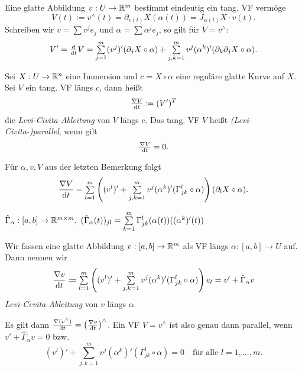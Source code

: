 \documentclass{cheat-sheet}
\begin{document}

\begin{bem}
  Eine glatte Abbildung $v : U \to \mathbb{R}^m$ bestimmt eindeutig ein tang. VF vermöge
  \[ V(t) := v^\wedge(t) = \partial_{v(t)} X(\alpha(t)) = J_{\alpha(t)} X \cdot v(t). \]
  Schreiben wir $v = \sum v^j e_j$ und $\alpha = \sum \alpha^j e_j$, so gilt für $V = v^\wedge$:
  \[ V' = \tfrac{\d}{\d t} V = \sum_{j=1}^m (v^j)' (\partial_j X \circ \alpha) + \sum_{j,k=1}^m v^j (\alpha^k)' (\partial_k \partial_j X \circ \alpha). \]
\end{bem}


\begin{defn}
  Sei $X : U \to \mathbb{R}^n$ eine Immersion und $c = X \circ \alpha$ eine reguläre glatte Kurve auf $X$. Sei $V$ ein tang. VF längs $c$, dann heißt
  \[ \tfrac{\nabla V}{\mathrm{d} t} \coloneqq (V')^T \]
  die \emph{Levi-Civita-Ableitung} von $V$ längs $c$. Das tang. VF $V$ heißt \emph{(Levi-Civita-)parallel}, wenn gilt
  \[ \tfrac{\nabla V}{\mathrm{d} t} = 0. \]
\end{defn}

\begin{bem}
  Für $\alpha, v, V$ aus der letzten Bemerkung folgt
  \[ \frac{\nabla V}{\d t} = \sum_{l=1}^m \left( (v^l)' + \sum_{j,k=1}^m v^j (\alpha^k)' (\Gamma_{jk}^l \circ \alpha) \right) (\partial_l X \circ \alpha). \]
\end{bem}

\begin{nota}
  $\hat{\Gamma}_{\alpha} : [a, b] \to \R^{m \times m}, \,\, (\hat{\Gamma}_{\alpha}(t))_{jl} = \sum_{k=1}^m \Gamma_{jk}^l (\alpha(t))((\alpha^k)'(t))$
\end{nota}

\begin{defn}
  Wir fassen eine glatte Abbildung $v : [a, b] \to \mathbb{R}^m$ als VF längs $\alpha : [a, b] \to U$ auf. Dann nennen wir
  \[ \frac{\nabla v}{\d t} \coloneqq \sum_{l=1}^m \left( (v^l)' + \sum_{j,k=1}^m v^j (\alpha^k)' (\Gamma_{jk}^l \circ \alpha) \right) e_l = v' + \hat{\Gamma}_{\alpha} v \]
  \emph{Levi-Cevita-Ableitung} von $v$ längs $\alpha$.
\end{defn}

\begin{satz}
  Es gilt dann $\tfrac{\nabla (v^\wedge)}{\mathrm{d} t} = \left( \tfrac{\nabla v}{\mathrm{d} t} \right)^\wedge$. Ein VF $V = v^\wedge$ ist also genau dann parallel, wenn $v' + \hat{\Gamma}_\alpha v = 0$ bzw.
  \[ (v^l)' + \sum_{j,k=1}^m v^j (\alpha^k)' (\Gamma_{jk}^l \circ \alpha) = 0 \quad \text{für alle $l = 1, ..., m$.} \]
\end{satz}
\end{document}
